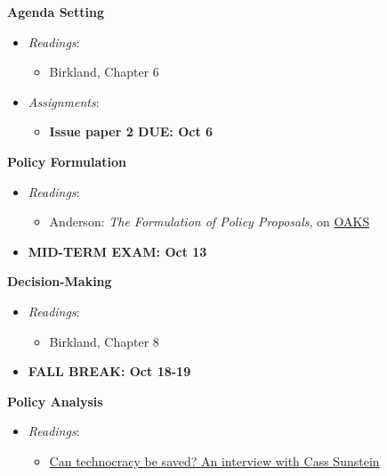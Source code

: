 \week \textbf{Agenda Setting}

\begin{itemize}

\item
  \emph{Readings}:

  \begin{itemize}
  
  \item
    Birkland, Chapter 6
  \end{itemize}
\item
  \emph{Assignments}:

  \begin{itemize}
  
  \item
    \textbf{Issue paper 2 DUE: Oct 6}
  \end{itemize}
\end{itemize}

\week \textbf{Policy Formulation}

\begin{itemize}

\item
  \emph{Readings}:

  \begin{itemize}
  
  \item
    Anderson: \emph{The Formulation of Policy Proposals}, on
    \href{https://lms.cofc.edu/d2l/login}{OAKS}
  \end{itemize}
\item
  \textbf{MID-TERM EXAM: Oct 13}
\end{itemize}

\week \textbf{Decision-Making}

\begin{itemize}

\item
  \emph{Readings}:

  \begin{itemize}
  
  \item
    Birkland, Chapter 8
  \end{itemize}
\item
  \textbf{FALL BREAK: Oct 18-19}
\end{itemize}

\week \textbf{Policy Analysis}

\begin{itemize}

\item
  \emph{Readings}:

  \begin{itemize}
  
  \item
    \href{https://www.vox.com/future-perfect/2018/10/22/18001014/cass-sunstein-cost-benefit-analysis-technocracy-liberalism}{Can
    technocracy be saved? An interview with Cass Sunstein}
  \end{itemize}
\end{itemize}

